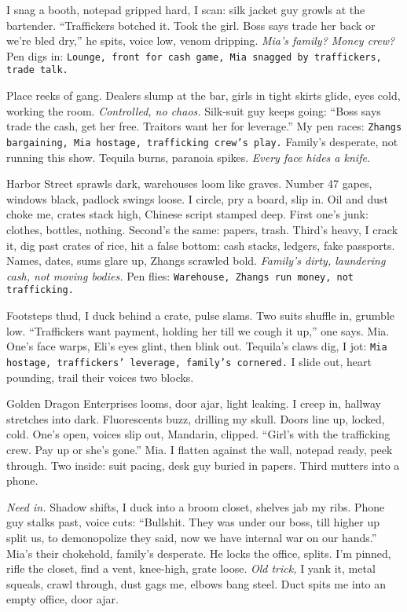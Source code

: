 \documentclass[12pt]{article}
\newcommand{\note}[1]{\texttt{#1}}
\begin{document}
I snag a booth, notepad gripped hard, I scan: silk jacket guy growls at the bartender. “Traffickers botched it. Took the girl. Boss says trade her back or we’re bled dry,” he spits, voice low, venom dripping. \textit{Mia’s family? Money crew?} Pen digs in: \note{Lounge, front for cash game, Mia snagged by traffickers, trade talk.}

Place reeks of gang. Dealers slump at the bar, girls in tight skirts glide, eyes cold, working the room. \textit{Controlled, no chaos.} Silk-suit guy keeps going: “Boss says trade the cash, get her free. Traitors want her for leverage.” My pen races: \note{Zhangs bargaining, Mia hostage, trafficking crew’s play.} Family’s desperate, not running this show. Tequila burns, paranoia spikes. \textit{Every face hides a knife.}

Harbor Street sprawls dark, warehouses loom like graves. Number 47 gapes, windows black, padlock swings loose. I circle, pry a board, slip in. Oil and dust choke me, crates stack high, Chinese script stamped deep. First one’s junk: clothes, bottles, nothing. Second’s the same: papers, trash. Third’s heavy, I crack it, dig past crates of rice, hit a false bottom: cash stacks, ledgers, fake passports. Names, dates, sums glare up, Zhangs scrawled bold. \textit{Family’s dirty, laundering cash, not moving bodies.} Pen flies: \note{Warehouse, Zhangs run money, not trafficking.}

Footsteps thud, I duck behind a crate, pulse slams. Two suits shuffle in, grumble low. “Traffickers want payment, holding her till we cough it up,” one says. \textnormal{Mia}. One’s face warps, \textnormal{Eli}’s eyes glint, then blink out. Tequila’s claws dig, I jot: \note{Mia hostage, traffickers’ leverage, family’s cornered.} I slide out, heart pounding, trail their voices two blocks.

Golden Dragon Enterprises looms, door ajar, light leaking. I creep in, hallway stretches into dark. Fluorescents buzz, drilling my skull. Doors line up, locked, cold. One’s open, voices slip out, Mandarin, clipped. “Girl’s with the trafficking crew. Pay up or she’s gone.” \textnormal{Mia}. I flatten against the wall, notepad ready, peek through. Two inside: suit pacing, desk guy buried in papers. Third mutters into a phone.

\textit{Need in.} Shadow shifts, I duck into a broom closet, shelves jab my ribs. Phone guy stalks past, voice cuts: “Bullshit. They was under our boss, till higher up split us, to demonopolize they said, now we have internal war on our hands.” \textnormal{Mia}’s their chokehold, family’s desperate. He locks the office, splits. I’m pinned, rifle the closet, find a vent, knee-high, grate loose. \textit{Old trick,} I yank it, metal squeals, crawl through, dust gags me, elbows bang steel. Duct spits me into an empty office, door ajar.
\end{document}
